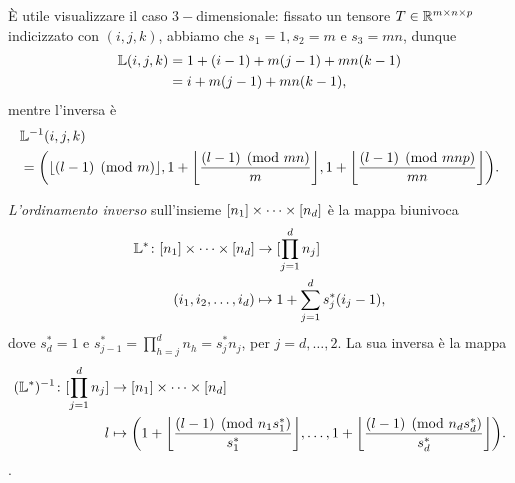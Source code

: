 \begin{example}
	È utile visualizzare il caso $ 3- $dimensionale: fissato un tensore $ T \in \mathbb{R}^{m\times
			n\times p}$ indicizzato con $ (i,j,k) $, abbiamo che $ s_1=1,s_2 = m $ e $ s_3 = mn $, dunque
	\begin{equation*}
		\begin{aligned}
			\mathbb{L}(i,j,k) & = 1 + (i-1) + m(j-1) + mn(k-1) \\
			          & = i + m(j-1) + mn(k-1),
		\end{aligned}
	\end{equation*}
	mentre l'inversa è
	\begin{equation*}
		\begin{aligned}
			 & \L^{-1}(i,j,k)                       \\
			 & = \left( \left\lfloor (l-1) \pmod{m}
			\right\rfloor, 1 + \left\lfloor \frac{(l-1) \pmod{mn}}{m} \right\rfloor, 1 + \left\lfloor
			\frac{(l-1) \pmod{mnp}}{mn} \right\rfloor \right).
		\end{aligned}
	\end{equation*}
\end{example}

\begin{definition}
	\emph{L'ordinamento inverso} sull'insieme $ \mdom! $ è la mappa biunivoca
	\begin{equation*}
		\begin{aligned}
			\L^* \colon \mdom! & \to [\prod_{j=1}^d n_j]                  \\
			(\miwc)            & \mapsto 1 + \sum_{j=1}^d s_j^*(i_j - 1),
		\end{aligned}
	\end{equation*} dove $ s_d^* =1 $ e $ s_{j-1}^* = \prod_{h=j}^{d} n_h = s_j^*n_j $, per $ j = d,\ldots,2 $. La sua inversa è la mappa
	\begin{equation*}
		\begin{aligned}
			(\L^*)^{-1} \colon [\prod_{j=1}^d n_j] & \to \mdom!                                                                                   \\
			l                                      & \mapsto \left(1 + \left\lfloor \frac{ (l-1)\pmod{n_1s_1^*}}{s_1^*}\right\rfloor, \ldots, 1 +
			\left\lfloor \frac{ (l-1)\pmod{n_ds_d^*}}{s_d^*} \right\rfloor \right).
		\end{aligned}
	\end{equation*}.
\end{definition}

